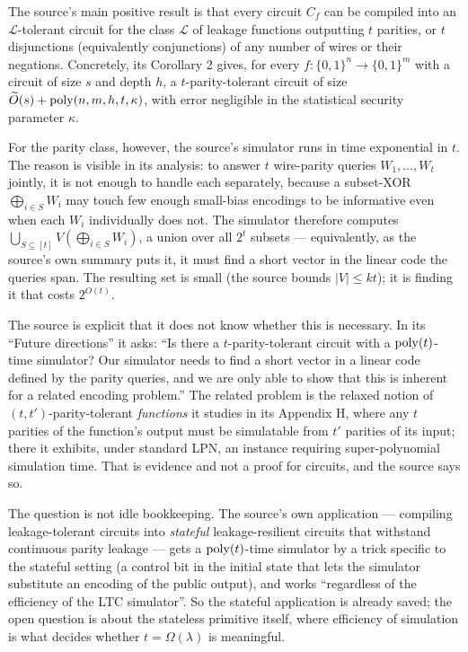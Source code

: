\documentclass{aicr-conjecture}
\newcommand{\bits}{\{0,1\}}
\newcommand{\Lc}{\mathcal{L}}
\newcommand{\Om}{\Omega}
\begin{document}
The source's main positive result is that every circuit $C_{f}$ can be
compiled into an $\Lc$-tolerant circuit for the class $\Lc$ of leakage
functions outputting $t$ parities, or $t$ disjunctions (equivalently
conjunctions) of any number of wires or their negations. Concretely, its
Corollary 2 gives, for every $f : \bits^{n} \to \bits^{m}$ with a
circuit of size $s$ and depth $h$, a $t$-parity-tolerant circuit of size
$\widetilde{O}(s) + \mathrm{poly}(n,m,h,t,\kappa)$, with error negligible in the
statistical security parameter $\kappa$.

For the parity class, however, the source's simulator runs in time
exponential in $t$. The reason is visible in its analysis: to answer $t$
wire-parity queries $W_{1}, \dots, W_{t}$ jointly, it is not enough to
handle each separately, because a subset-XOR $\bigoplus_{i \in S} W_{i}$
may touch few enough small-bias encodings to be informative even when
each $W_{i}$ individually does not. The simulator therefore computes
$\bigcup_{S \subseteq [t]} V(\bigoplus_{i \in S} W_{i})$, a union over
all $2^{t}$ subsets --- equivalently, as the source's own summary puts
it, it must find a short vector in the linear code the queries span. The
resulting set is small (the source bounds $|V| \le kt$); it is finding it
that costs $2^{O(t)}$.

The source is explicit that it does not know whether this is necessary.
In its ``Future directions'' it asks: ``Is there a
$t$-parity-tolerant circuit with a $\mathrm{poly}(t)$-time simulator? Our
simulator needs to find a short vector in a linear code defined by the
parity queries, and we are only able to show that this is inherent for a
related encoding problem.'' The related problem is the relaxed notion of
$(t,t')$-parity-tolerant \emph{functions} it studies in its
Appendix H, where any $t$ parities of the function's output must be
simulatable from $t'$ parities of its input; there it exhibits, under
standard LPN, an instance requiring super-polynomial simulation time.
That is evidence and not a proof for circuits, and the source says so.

The question is not idle bookkeeping. The source's own application ---
compiling leakage-tolerant circuits into \emph{stateful}
leakage-resilient circuits that withstand continuous parity leakage ---
gets a $\mathrm{poly}(t)$-time simulator by a trick specific to the stateful
setting (a control bit in the initial state that lets the simulator
substitute an encoding of the public output), and works ``regardless of
the efficiency of the LTC simulator''. So the stateful application is
already saved; the open question is about the stateless primitive
itself, where efficiency of simulation is what decides whether
$t = \Om(\lambda)$ is meaningful.
\end{document}

